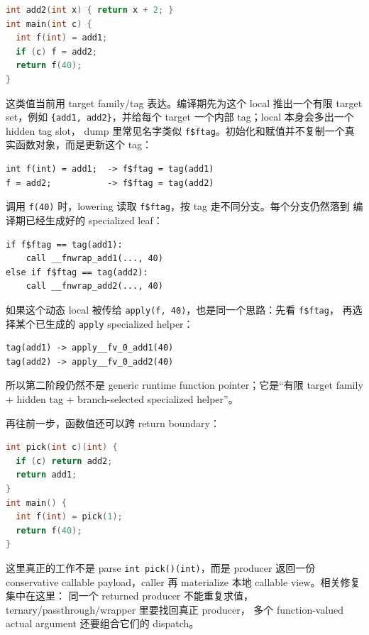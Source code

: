 \documentclass[UTF8,a4paper,11pt]{ctexart}
\begin{document}
\begin{lstlisting}[language=C]
int add2(int x) { return x + 2; }
int main(int c) {
  int f(int) = add1;
  if (c) f = add2;
  return f(40);
}
\end{lstlisting}

这类值当前用 target family/tag 表达。编译期先为这个 local 推出一个有限 target set，例如
\texttt{\{add1, add2\}}，并给每个 target 一个内部 tag；local 本身会多出一个 hidden tag slot，
dump 里常见名字类似 \texttt{f\$ftag}。初始化和赋值并不复制一个真实函数对象，而是更新这个
tag：

\begin{lstlisting}[language={}]
int f(int) = add1;  -> f$ftag = tag(add1)
f = add2;           -> f$ftag = tag(add2)
\end{lstlisting}

调用 \texttt{f(40)} 时，lowering 读取 \texttt{f\$ftag}，按 tag 走不同分支。每个分支仍然落到
编译期已经生成好的 specialized leaf：

\begin{lstlisting}[language={}]
if f$ftag == tag(add1):
    call __fnwrap_add1(..., 40)
else if f$ftag == tag(add2):
    call __fnwrap_add2(..., 40)
\end{lstlisting}

如果这个动态 local 被传给 \texttt{apply(f, 40)}，也是同一个思路：先看 \texttt{f\$ftag}，
再选择某个已生成的 \texttt{apply} specialized helper：

\begin{lstlisting}[language={}]
tag(add1) -> apply__fv_0_add1(40)
tag(add2) -> apply__fv_0_add2(40)
\end{lstlisting}

所以第二阶段仍然不是 generic runtime function pointer；它是“有限 target family + hidden tag
+ branch-selected specialized helper”。

再往前一步，函数值还可以跨 return boundary：

\begin{lstlisting}[language=C]
int pick(int c)(int) {
  if (c) return add2;
  return add1;
}
int main() {
  int f(int) = pick(1);
  return f(40);
}
\end{lstlisting}

这里真正的工作不是 parse \texttt{int pick()(int)}，而是 producer 返回一份 conservative
callable payload，caller 再 materialize 本地 callable view。相关修复集中在这里：
同一个 returned producer 不能重复求值，ternary/passthrough/wrapper 里要找回真正 producer，
多个 function-valued actual argument 还要组合它们的 dispatch。
\end{document}
